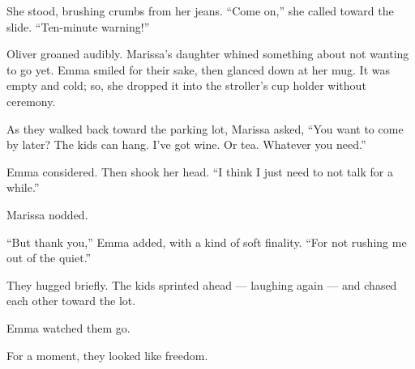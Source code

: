 She stood, brushing crumbs from her jeans. ``Come on,'' she called toward the slide. ``Ten-minute warning!''

Oliver groaned audibly. 
Marissa’s daughter whined something about not wanting to go yet. 
Emma smiled for their sake, then glanced down at her mug. 
It was empty and cold; so, she dropped it into the stroller’s cup holder without ceremony.

As they walked back toward the parking lot, Marissa asked, ``You want to come by later? The kids can hang. 
I’ve got wine. Or tea. Whatever you need.''

Emma considered. Then shook her head. ``I think I just need to not talk for a while.''

Marissa nodded.

``But thank you,'' Emma added, with a kind of soft finality. ``For not rushing me out of the quiet.''

They hugged briefly. 
The kids sprinted ahead --- laughing again --- and chased each other toward the lot.

Emma watched them go.

For a moment, they looked like freedom.

\medskip

